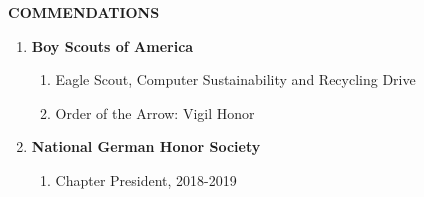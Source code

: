 \documentclass[11pt]{article}
\begin{document}
{\Large \textbf{COMMENDATIONS}}
\begin{enumerate}[label={}]
    \item \textbf{Boy Scouts of America}
    \begin{enumerate}[label={--}]
        \item Eagle Scout, Computer Sustainability and Recycling Drive
        \item Order of the Arrow: Vigil Honor
    \end{enumerate}
    \item \textbf{National German Honor Society}
    \begin{enumerate}[label={--}]
        \item Chapter President, 2018-2019
    \end{enumerate}
\end{enumerate}
\end{document}
